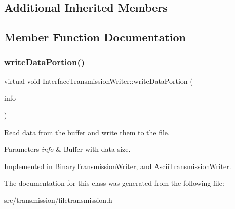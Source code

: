 \subsection*{Additional Inherited Members}


\subsection{Member Function Documentation}
\mbox{\label{classInterfaceTransmissionWriter_a024c3a22d937e659259f2eb242b3ea97}} 
\subsubsection{\texorpdfstring{write\+Data\+Portion()}{writeDataPortion()}}
{\footnotesize\ttfamily virtual void Interface\+Transmission\+Writer\+::write\+Data\+Portion (\begin{DoxyParamCaption}\item[{Buffer\+Info}]{info }\end{DoxyParamCaption})\hspace{0.3cm}{\ttfamily [pure virtual]}}



Read data from the buffer and write them to the file. 


\begin{DoxyParams}{Parameters}
{\em info} & Buffer with data size. \\
\hline
\end{DoxyParams}


Implemented in \hyperlink{classBinaryTransmissionWriter_aaeee88a165c1a53ef89849c08df6a5e1}{Binary\+Transmission\+Writer}, and \hyperlink{classAsciiTransmissionWriter_a49127d2b72eceeb35211d91601434a27}{Ascii\+Transmission\+Writer}.



The documentation for this class was generated from the following file\+:\begin{DoxyCompactItemize}
\item 
src/transmission/filetransmission.\+h\end{DoxyCompactItemize}
